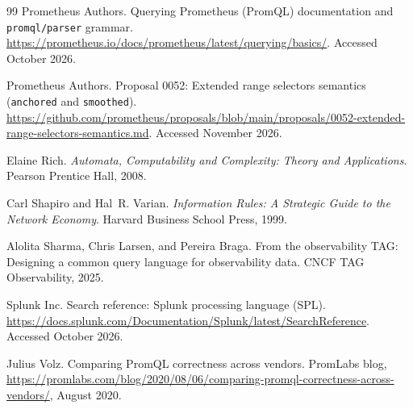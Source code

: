 \begin{thebibliography}{99}
{Prometheus Authors}.
\newblock Querying {Prometheus} ({PromQL}) documentation and \texttt{promql/parser} grammar.
\newblock \url{https://prometheus.io/docs/prometheus/latest/querying/basics/}. Accessed October 2026.

{Prometheus Authors}.
\newblock Proposal 0052: Extended range selectors semantics (\texttt{anchored} and \texttt{smoothed}).
\newblock \url{https://github.com/prometheus/proposals/blob/main/proposals/0052-extended-range-selectors-semantics.md}.
Accessed November 2026.

Elaine Rich.
\newblock \emph{Automata, Computability and Complexity: Theory and Applications}.
\newblock Pearson Prentice Hall, 2008.

Carl Shapiro and Hal~R. Varian.
\newblock \emph{Information Rules: A Strategic Guide to the Network Economy}.
\newblock Harvard Business School Press, 1999.

Alolita Sharma, Chris Larsen, and Pereira Braga.
\newblock From the observability {TAG}: Designing a common query language for observability data.
\newblock CNCF TAG Observability, 2025.

{Splunk Inc.}
\newblock Search reference: Splunk processing language ({SPL}).
\newblock \url{https://docs.splunk.com/Documentation/Splunk/latest/SearchReference}. Accessed October 2026.

Julius Volz.
\newblock Comparing {PromQL} correctness across vendors.
\newblock PromLabs blog,
\url{https://promlabs.com/blog/2020/08/06/comparing-promql-correctness-across-vendors/}, August 2020.

\end{thebibliography}
